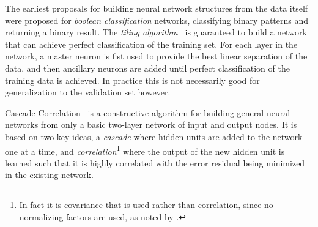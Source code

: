 \documentclass[thesis]{subfiles}
\begin{document}
	The earliest proposals for building neural network structures from the data itself were proposed for \emph{boolean classification} networks, \ie classifying binary patterns and returning a binary result. The \emph{tiling algorithm}~\citep{mezard1989learning} is guaranteed to build a network that can achieve perfect classification of the training set. For each layer in the network, a master neuron is fist used to provide the best linear separation of the data, and then ancillary neurons are added until perfect classification of the training data is achieved. In practice this is not necessarily good for generalization to the validation set however. 
	
	Cascade Correlation~\citep{Fahlman1989} is a constructive algorithm for building general neural networks from only a basic two-layer network of input and output nodes. It is based on two key ideas, a \emph{cascade} where hidden units are added to the network one at a time, and \emph{correlation}\footnote{In fact it is covariance that is used rather than correlation, since no normalizing factors are used, as noted by \citet{Fahlman1989}.} where the output of the new hidden unit is learned such that it is highly correlated with the error residual being minimized in the existing network.
	
\end{document}

